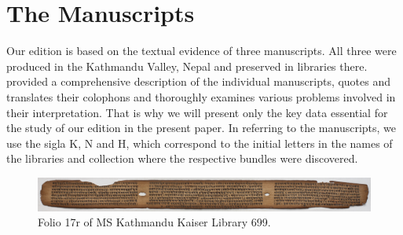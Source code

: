 \chapter{The Manuscripts}

Our edition is based on the textual evidence of three manuscripts.  All three were
produced in the Kathmandu Valley, Nepal and preserved in libraries there.
\textcites[\S 2.1]{kleb-2021b} provided a comprehensive description of the
individual manuscripts, quotes and translates their colophons and thoroughly
examines various problems involved in their interpretation. That is why we will
present only the key data essential for the study of our edition in the present
paper. In referring to the manuscripts, we use the sigla K, N and H, which
correspond to the initial letters in the names of the libraries and collection
where the respective bundles were discovered.

\begin{figure}[t]
    \centering
    \includegraphics[draft=false,width=1\linewidth]{"media/017r IMG_0065"}
    \caption{Folio 17r of MS Kathmandu Kaiser Library 699.}
    \label{fig:017r-img0065}
\end{figure}


